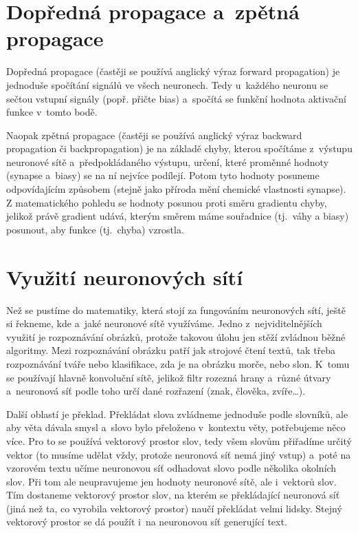 \documentclass[12pt]{report}			%
\begin{document}
				\section{Dopředná propagace a~zpětná propagace}
					Dopředná propagace (častěji se používá anglický výraz forward propagation) je jednoduše spočítání signálů ve všech neuronech. Tedy u~každého neuronu se sečtou vstupní signály (popř. přičte bias) a~spočítá se funkční hodnota aktivační funkce v~tomto bodě.
					
					Naopak zpětná propagace (častěji se používá anglický výraz backward propagation či back\-propagation) je na základě chyby, kterou spočítáme z~výstupu neuronové sítě a~předpokládaného výstupu, určení, které proměnné hodnoty (\gls{synapse} a~biasy) se na ní nejvíce podílejí. Potom tyto hodnoty posuneme odpovídajícím způsobem (stejně jako příroda mění chemické vlastnosti \gls{synapse}). Z matematického pohledu se hodnoty posunou proti směru \gls{gradient}u chyby, jelikož právě \gls{gradient} udává, kterým směrem máme souřadnice (tj.~váhy a biasy) posunout, aby funkce (tj.~chyba) vzrostla.
					
				\section{Využití neuronových sítí}
					Než se pustíme do matematiky, která stojí za fungováním neuronových sítí, ještě si řekneme, kde a~jaké neuronové sítě využíváme. Jedno z~nejviditelnějších využití je rozpoznávání obrázků, protože takovou úlohu jen stěží zvládnou běžné algoritmy. Mezi rozpoznávání obrázku patří jak strojové čtení textů, tak třeba rozpoznávání tváře nebo klasifikace, zda je na obrázku morče, nebo slon. K~tomu se používají hlavně konvoluční sítě, jelikož filtr rozezná hrany a~různé útvary a~neuronová síť podle toho určí dané rozřazení (znak, člověka, zvíře\ldots).
					
					Další oblastí je překlad. Překládat slova zvládneme jednoduše podle slovníků, ale aby věta dávala smysl a~slovo bylo přeloženo v~kontextu věty, potřebujeme něco více. Pro to se používá vektorový prostor slov, tedy všem slovům přiřadíme určitý vektor (to musíme udělat vždy, protože neuronová síť nemá jiný vstup) a~poté na vzorovém textu učíme neuronovou síť odhadovat slovo podle několika okolních slov. Při tom ale neupravujeme jen hodnoty neuronové sítě, ale i~vektorů slov. Tím dostaneme vektorový prostor slov, na kterém se překládající neuronová síť (jiná než ta, co vyrobila vektorový prostor) naučí překládat velmi lidsky. Stejný vektorový prostor se dá použít i~na neuronovou síť generující text.
					
\end{document}
